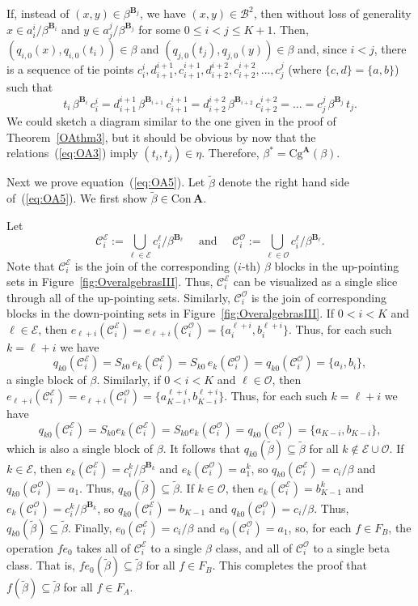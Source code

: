 \documentclass[cm,dissertation,actual,final]{uhthesis}
\theoremstyle{plain}
\theoremstyle{definition}
\theoremstyle{remark}
\numberwithin{theorem}{section}
\numberwithin{claim}{chapter}
\numberwithin{equation}{section}
\numberwithin{conjecture}{chapter}
\newcommand{\<}{\ensuremath{\langle}}
\renewcommand{\>}{\ensuremath{\rangle}}
\renewcommand{\leq}{\ensuremath{\leqslant}}
\newcommand{\Cg}{\ensuremath{\mathrm{Cg}}}
\newcommand{\Con}{\ensuremath{\mathrm{Con\,}}}
\newcommand{\0}{\ensuremath{\mathbf{0}}}
\newcommand{\1}{\ensuremath{\mathbf{1}}}
\newcommand{\2}{\ensuremath{\mathbf{2}}}
\newcommand{\3}{\ensuremath{\mathbf{3}}}
\newcommand{\4}{\ensuremath{\mathbf{4}}}
\newcommand{\5}{\ensuremath{\mathbf{5}}}
\newcommand{\bA}{\ensuremath{\mathbf{A}}}
\newcommand{\bB}{\ensuremath{\mathbf{B}}}
\newcommand{\sB}{\ensuremath{\mathscr{B}}}
\newcommand{\sC}{\ensuremath{\mathscr{C}}}
\newcommand{\sE}{\ensuremath{\mathscr{E}}}
\newcommand{\sO}{\ensuremath{\mathscr{O}}}
\newcommand{\tbeta}{\ensuremath{\widetilde{\beta}}}
\newcommand{\CE}{\ensuremath{\sC_i^{\sE}}}
\newcommand{\CO}{\ensuremath{\sC_i^{\sO}}}
\begin{document}
If, instead of $(x,y)\in \beta^{\bB_j}$, we have 
$(x,y)\in \sB^2$, then without loss of generality $x\in a_i^i/\beta^{\bB_i}$ and 
$y\in a_j^j/\beta^{\bB_j}$ for some $0\leq i < j \leq K+1$.
Then, %
$(q_{i,0}(x),q_{i,0}(t_i)) \in \beta$ and 
$(q_{j,0}(t_j),q_{j,0}(y)) \in \beta$ and, since $i<j$, there is a sequence of tie points
$c_i^i, d_{i+1}^{i+1}, c_{i+1}^{i+1}, d_{i+2}^{i+2}, c_{i+2}^{i+2}, \dots,
c_j^j$ (where $\{c, d\} = \{a, b\}$) such that
\begin{equation}
  \label{eq:OA3}
  t_i \, \beta^{\bB_i}\, c_i^i = 
  d_{i+1}^{i+1} \, \beta^{\bB_{i+1}}\, c_{i+1}^{i+1} =
  d_{i+2}^{i+2} \, \beta^{\bB_{i+2}}\, c_{i+2}^{i+2}= \dots
  = c_j^j \, \beta^{\bB_{j}} \, t_j.
\end{equation}
We could sketch a diagram similar to the one given in the proof of
Theorem~\ref{OAthm3}, but it should be obvious by now that the relations~(\ref{eq:OA3})
imply $(t_i, t_j) \in \eta$.  Therefore, $\beta^* = \Cg^{\bA}(\beta)$.

Next we prove equation~(\ref{eq:OA5}).  Let $\tbeta$ denote the right hand side
of~(\ref{eq:OA5}).  We first show $\tbeta\in \Con\bA$.

Let 
\[
\CE:= \bigcup_{\ell \in \sE} c_i^\ell/\beta^{\bB_{\ell}} \quad \text{ and }
\quad 
\CO:=\bigcup_{\ell \in \sO} c_i^\ell/\beta^{\bB_{\ell}}.
\]
Note that $\CE$ is the join of the corresponding ($i$-th) $\beta$ blocks in the
up-pointing sets in Figure~\ref{fig:OveralgebrasIII}.  Thus, $\CE$ can be
visualized as a single slice through all of the up-pointing sets.  Similarly,
$\CO$ is the join of corresponding blocks in the down-pointing sets 
in Figure~\ref{fig:OveralgebrasIII}.  
If $0< i< K$ and $\ell \in \sE$, then
$e_{\ell+i}(\CE) = e_{\ell+i}(\CO) = \{a_i^{\ell+i}, b_i^{\ell+i}\}$.
Thus, for each such $k=\ell+i$ we have 
\[
q_{k0}(\CE) = S_{k0}\,e_k(\CE) = S_{k0}\,e_k(\CO) = q_{k0}(\CO)
= \{a_i, b_i\},
\]
a single block of $\beta$.
Similarly, if $0< i< K$ and $\ell \in \sO$, then
$e_{\ell+i}(\CE) = 
e_{\ell+i}(\CO) = \{a_{K-i}^{\ell+i}, b_{K-i}^{\ell+i}\}$.
Thus, for each such $k=\ell+i$ we have 
\[
q_{k0}(\CE) = S_{k0}e_k(\CE) = S_{k0}e_k(\CO) = q_{k0}(\CO)
= \{a_{K-i}, b_{K-i}\},
\]
which is also a single block of $\beta$.  
It follows that $q_{k0}(\tbeta)\subseteq \tbeta$ for all $k\notin \sE \cup \sO$.
If $k\in \sE$, then $e_k(\CE) = c_i^k/\beta^{\bB_k}$
and $e_k(\CO) = a_1^k$, so $q_{k0}(\CE) = c_i/\beta$ and 
$q_{k0}(\CO) = a_1$.  
Thus, $q_{k0}(\tbeta)\subseteq \tbeta$.
If $k\in \sO$, then 
$e_k(\CE) = b_{K-1}^k$ and $e_k(\CO) = c_i^k/\beta^{\bB_k}$,
so $q_{k0}(\CE) = b_{K-1} $ and 
$q_{k0}(\CO)= c_i/\beta$.  Thus, 
$q_{k0}(\tbeta)\subseteq \tbeta$.
Finally, $e_{0}(\CE) = c_i/\beta$ and 
$e_{0}(\CO) = a_1$, so, for each $f\in F_B$, the operation
$fe_{0}$ takes all of $\CE$ to a single $\beta$ class, and all of $\CO$ to a
single beta class.  That is, $fe_0(\tbeta)\subseteq \tbeta$ for all $f\in F_B$.
This completes the proof that $f(\tbeta)\subseteq \tbeta$ for all $f\in F_A$.
\end{document}
